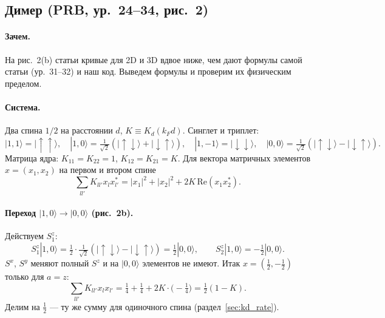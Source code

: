 
\subsection{Димер (PRB, ур.~24--34, рис.~2)}
\label{sec:kd_dimer}

\paragraph{Зачем.} На рис.~2(b) статьи кривые для 2D и 3D вдвое ниже, чем дают
формулы самой статьи (ур.~31--32) и наш код. Выведем формулы и проверим их
физическим пределом.

\paragraph{Система.} Два спина $1/2$ на расстоянии $d$, $K\equiv K_d(k_Fd)$. Синглет и
триплет:
\[
|1,1\rangle=|\!\uparrow\uparrow\rangle,\quad
|1,0\rangle=\tfrac{1}{\sqrt2}(|\!\uparrow\downarrow\rangle+|\!\downarrow\uparrow\rangle),\quad
|1,-1\rangle=|\!\downarrow\downarrow\rangle,\quad
|0,0\rangle=\tfrac{1}{\sqrt2}(|\!\uparrow\downarrow\rangle-|\!\downarrow\uparrow\rangle).
\]
Матрица ядра: $K_{11}=K_{22}=1$, $K_{12}=K_{21}=K$. Для вектора матричных элементов
$x=(x_1,x_2)$ на первом и втором спине
\[
\sum_{ll'}K_{ll'}x_lx_{l'}^*=|x_1|^2+|x_2|^2+2K\,\mathrm{Re}(x_1x_2^*).
\]

\paragraph{Переход $|1,0\rangle\to|0,0\rangle$ (рис.~2b).} Действуем $S^z_1$:
\[
S^z_1|1,0\rangle=\tfrac12\cdot\tfrac1{\sqrt2}(|\!\uparrow\downarrow\rangle-|\!\downarrow\uparrow\rangle)=\tfrac12|0,0\rangle,\qquad
S^z_2|1,0\rangle=-\tfrac12|0,0\rangle .
\]
$S^x$, $S^y$ меняют полный $S^z$ и на $|0,0\rangle$ элементов не имеют. Итак
$x=(\tfrac12,-\tfrac12)$ только для $a=z$:
\[
\sum_{ll'}K_{ll'}x_lx_{l'}=\tfrac14+\tfrac14+2K\cdot\big(-\tfrac14\big)=\tfrac12(1-K).
\]
Делим на $\tfrac12$ --- ту же сумму для одиночного спина (раздел~\ref{sec:kd_rate}).

